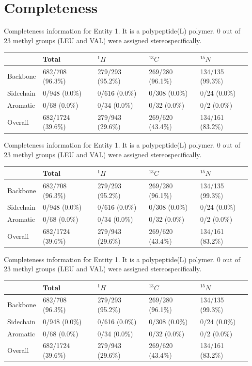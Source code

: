 \section{Completeness}
Completeness information for Entity 1. It is a polypeptide(L) polymer. 0 out of 23 methyl groups (LEU and VAL) were assigned stereospecifically.\begin{longtable}{|l|l|l|l|l|}
\hline
  & Total & $^{1}H$ & $^{13}C$ & $^{15}N$\\\hline
Backbone & 682/708 (96.3\%)& 279/293 (95.2\%)& 269/280 (96.1\%)& 134/135 (99.3\%) \\
\hline
Sidechain & 0/948 (0.0\%)& 0/616 (0.0\%)& 0/308 (0.0\%)& 0/24 (0.0\%) \\
\hline
Aromatic & 0/68 (0.0\%)& 0/34 (0.0\%)& 0/32 (0.0\%)& 0/2 (0.0\%) \\
\hline
Overall & 682/1724 (39.6\%)& 279/943 (29.6\%)& 269/620 (43.4\%)& 134/161 (83.2\%) \\
\hline
\end{longtable}
Completeness information for Entity 1. It is a polypeptide(L) polymer. 0 out of 23 methyl groups (LEU and VAL) were assigned stereospecifically.\begin{longtable}{|l|l|l|l|l|}
\hline
  & Total & $^{1}H$ & $^{13}C$ & $^{15}N$\\\hline
Backbone & 682/708 (96.3\%)& 279/293 (95.2\%)& 269/280 (96.1\%)& 134/135 (99.3\%) \\
\hline
Sidechain & 0/948 (0.0\%)& 0/616 (0.0\%)& 0/308 (0.0\%)& 0/24 (0.0\%) \\
\hline
Aromatic & 0/68 (0.0\%)& 0/34 (0.0\%)& 0/32 (0.0\%)& 0/2 (0.0\%) \\
\hline
Overall & 682/1724 (39.6\%)& 279/943 (29.6\%)& 269/620 (43.4\%)& 134/161 (83.2\%) \\
\hline
\end{longtable}
Completeness information for Entity 1. It is a polypeptide(L) polymer. 0 out of 23 methyl groups (LEU and VAL) were assigned stereospecifically.\begin{longtable}{|l|l|l|l|l|}
\hline
  & Total & $^{1}H$ & $^{13}C$ & $^{15}N$\\\hline
Backbone & 682/708 (96.3\%)& 279/293 (95.2\%)& 269/280 (96.1\%)& 134/135 (99.3\%) \\
\hline
Sidechain & 0/948 (0.0\%)& 0/616 (0.0\%)& 0/308 (0.0\%)& 0/24 (0.0\%) \\
\hline
Aromatic & 0/68 (0.0\%)& 0/34 (0.0\%)& 0/32 (0.0\%)& 0/2 (0.0\%) \\
\hline
Overall & 682/1724 (39.6\%)& 279/943 (29.6\%)& 269/620 (43.4\%)& 134/161 (83.2\%) \\
\hline
\end{longtable}
